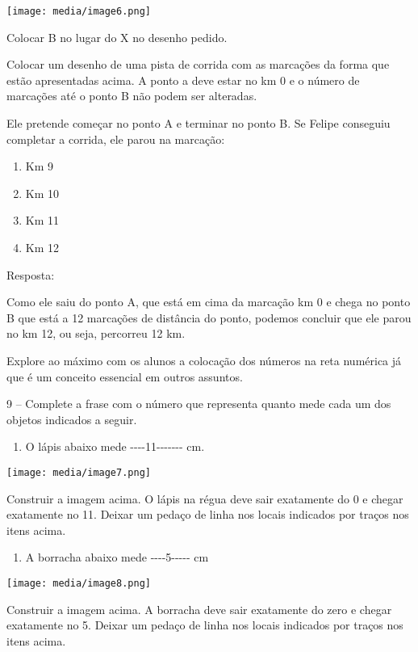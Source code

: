 \texttt{[image: media/image6.png]}

Colocar B no lugar do X no desenho pedido.

Colocar um desenho de uma pista de corrida com as marcações da forma que
estão apresentadas acima. A ponto a deve estar no km 0 e o número de
marcações até o ponto B não podem ser alteradas.

Ele pretende começar no ponto A e terminar no ponto B. Se Felipe
conseguiu completar a corrida, ele parou na marcação:

\begin{enumerate}
\def\labelenumi{\alph{enumi})}
\item
  Km 9
\item
  Km 10
\item
  Km 11
\item
  Km 12
\end{enumerate}

Resposta:

Como ele saiu do ponto A, que está em cima da marcação km 0 e chega no
ponto B que está a 12 marcações de distância do ponto, podemos concluir
que ele parou no km 12, ou seja, percorreu 12 km.

Explore ao máximo com os alunos a colocação dos números na reta numérica
já que é um conceito essencial em outros assuntos.

9 -- Complete a frase com o número que representa quanto mede cada um
dos objetos indicados a seguir.

\begin{enumerate}
\def\labelenumi{\alph{enumi})}
\item
  O lápis abaixo mede -\/-\/-\/-11-\/-\/-\/-\/-\/-\/- cm.
\end{enumerate}

\texttt{[image: media/image7.png]}

Construir a imagem acima. O lápis na régua deve sair exatamente do 0 e
chegar exatamente no 11. Deixar um pedaço de linha nos locais indicados
por traços nos itens acima.

\begin{enumerate}
\def\labelenumi{\alph{enumi})}
\item
  A borracha abaixo mede -\/-\/-\/-5-\/-\/-\/-\/- cm
\end{enumerate}

\texttt{[image: media/image8.png]}

Construir a imagem acima. A borracha deve sair exatamente do zero e
chegar exatamente no 5. Deixar um pedaço de linha nos locais indicados
por traços nos itens acima.

